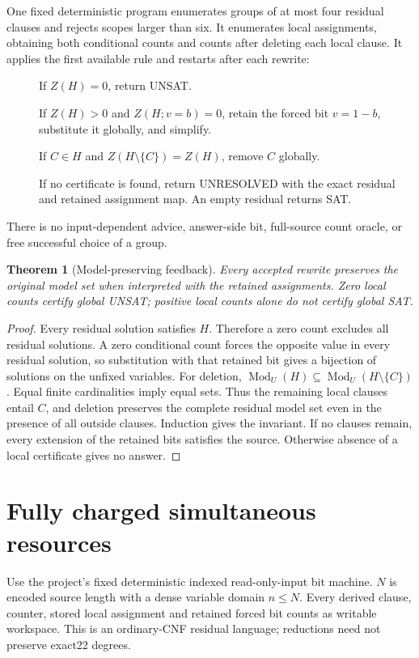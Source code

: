 \documentclass[11pt]{article}
\newtheorem{theorem}{Theorem}
\begin{document}
One fixed deterministic program enumerates groups of at most four residual
clauses and rejects scopes larger than six. It enumerates local assignments,
obtaining both conditional counts and counts after deleting each local clause.
It applies the first available rule and restarts after each rewrite:
\begin{description}
\item[] If $Z(H)=0$, return UNSAT.
\item[] If $Z(H)>0$ and $Z(H;v=b)=0$, retain the forced bit $v=1-b$,
substitute it globally, and simplify.
\item[] If $C\in H$ and $Z(H\setminus\{C\})=Z(H)$, remove $C$ globally.
\item[] If no certificate is found, return UNRESOLVED with the exact
residual and retained assignment map. An empty residual returns SAT.
\end{description}
There is no input-dependent advice, answer-side bit, full-source count oracle,
or free successful choice of a group.

\begin{theorem}[Model-preserving feedback]
Every accepted rewrite preserves the original model set when interpreted
with the retained assignments. Zero local counts certify global UNSAT;
positive local counts alone do not certify global SAT.
\end{theorem}
\begin{proof}
Every residual solution satisfies $H$. Therefore a zero count excludes all
residual solutions. A zero conditional count forces the opposite value in
every residual solution, so substitution with that retained bit gives a
bijection of solutions on the unfixed variables.
For deletion,
$\operatorname{Mod}_U(H)\subseteq\operatorname{Mod}_U(H\setminus\{C\})$.
Equal finite cardinalities imply equal sets. Thus the remaining local
clauses entail $C$, and deletion preserves the complete residual model set
even in the presence of all outside clauses. Induction gives the invariant.
If no clauses remain, every extension of the retained bits satisfies the
source. Otherwise absence of a local certificate gives no answer.
\end{proof}

\section{Fully charged simultaneous resources}
Use the project's fixed deterministic indexed read-only-input bit machine.
$N$ is encoded source length with a dense variable domain $n\le N$.
Every derived clause, counter, stored local assignment and retained forced
bit counts as writable workspace. This is an ordinary-CNF residual language;
reductions need not preserve exact22 degrees.
\end{document}
